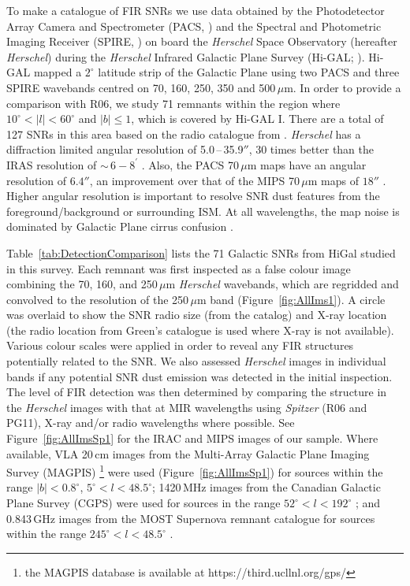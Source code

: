 \documentclass[fleqn,usenatbib]{mnras}
\newcommand\numStudied{71 }		%
\begin{document}
{To make a catalogue of FIR SNRs we use data obtained by the Photodetector Array Camera and Spectrometer (PACS, \citealp{Poglitsch2010}) and the Spectral and Photometric Imaging Receiver (SPIRE, \citealp{Griffin2010}) on board the \textit{Herschel} Space Observatory (hereafter \textit{Herschel}) \citep{Pilbratt2010} during the \textit{Herschel} Infrared Galactic Plane Survey (Hi-GAL; \citealp{Molinari2011}). Hi-GAL mapped a $2^{\circ}$ latitude strip of the Galactic Plane using two PACS and three SPIRE wavebands centred on 70, 160, 250, 350 and 500\,$\mu$m. In order to provide a comparison with R06, we study \numStudied remnants within the region where $10^{\circ} < \mid l \mid <60^{\circ}$ and $\mid b \mid \leq 1$, which is covered by Hi-GAL I. There are a total of 127 SNRs in this area based on the radio catalogue from \citet{Green2014}.
\textit{Herschel} has a diffraction limited angular resolution of 5.0\,--\,35.9$''$, 30 times better than the IRAS resolution of $\sim\,6-8^\prime$ \citep{Saken1992}.
Also, the PACS 70\,$\mu$m maps have an angular resolution of $6.4''$, an improvement over that of the MIPS 70\,$\mu$m maps of $18''$ \citep{Carey2009}. Higher angular resolution is important to resolve SNR dust features from the foreground/background or surrounding ISM. At all wavelengths, the map noise is dominated by Galactic Plane cirrus confusion \citep{Molinari2013}.

Table~\ref{tab:DetectionComparison} lists the \numStudied Galactic SNRs from HiGal studied in this survey. Each remnant was first inspected as a false colour image combining the 70, 160, and 250\,$\mu$m \textit{Herschel} wavebands, which are regridded and convolved to the resolution of the 250\,$\mu$m band (Figure~\ref{fig:AllIms1}). A circle was overlaid to show the SNR radio size (from the \citet{Green2014} catalog) and X-ray location (the radio location from Green's catalogue is used where X-ray is not available). Various colour scales were applied in order to reveal any FIR structures potentially related to the SNR. We also assessed \textit{Herschel} images in individual bands if any potential SNR dust emission was detected in the initial inspection.
The level of FIR detection was then determined by comparing the structure in the \textit{Herschel} images with that at MIR wavelengths using \textit{Spitzer} (R06 and PG11), X-ray and/or radio wavelengths where possible. See Figure~\ref{fig:AllImsSp1} for the IRAC and MIPS images of our sample. Where available, VLA 20\,cm images from the Multi-Array Galactic Plane Imaging Survey (MAGPIS) \citep{Helfand2006} \footnote{the MAGPIS database is available at https://third.ucllnl.org/gps/} were used (Figure~\ref{fig:AllImsSp1}) for sources within the range $\mid b \mid<0.8^{\circ}$, $5^{\circ}<l<48.5^{\circ}$; 1420\,MHz images from the Canadian Galactic Plane Survey (CGPS) were used for sources in the range $52^{\circ}<l<192^{\circ}$ \citep{Taylor2003}; and 0.843\,GHz images from the MOST Supernova remnant catalogue for sources within the range $245^{\circ}<l<48.5^{\circ}$ \citep{Whiteoak1996}.

}
\end{document}
